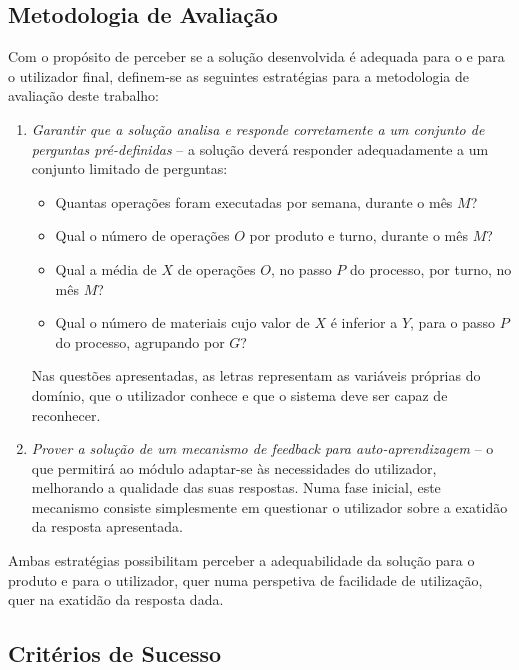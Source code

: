 \subsection{Metodologia de Avaliação}
Com o propósito de perceber se a solução desenvolvida é adequada para o {\productname} e para o utilizador final, definem-se as seguintes estratégias para a metodologia de avaliação deste trabalho:

\begin{enumerate}
\label{enum:pre1_qualitystrategies}
    \item 
    {
        \textit{Garantir que a solução analisa e responde corretamente a um conjunto de perguntas pré-definidas} -- a solução deverá responder adequadamente a um conjunto limitado de perguntas:
        \begin{itemize}
            \item 
            {
                Quantas operações foram executadas por semana, durante o mês $M$?
            }
            \item
            {
                Qual o número de operações $O$ por produto e turno, durante o mês $M$?
            }
            \item
            {
                Qual a média de $X$ de operações $O$, no passo $P$ do processo, por turno, no mês $M$? 
            }
            \item
            {
                Qual o número de materiais cujo valor de $X$ é inferior a $Y$, para o passo $P$ do processo, agrupando por $G$?
            }
        \end{itemize}
        
        Nas questões apresentadas, as letras representam as variáveis próprias do domínio, que o utilizador conhece e que o sistema deve ser capaz de reconhecer.
    }
    \item
    {
        \textit{Prover a solução de um mecanismo de feedback para auto-aprendizagem} -- o que permitirá ao módulo adaptar-se às necessidades do utilizador, melhorando a qualidade das suas respostas. Numa fase inicial, este mecanismo consiste simplesmente em questionar o utilizador sobre a exatidão da resposta apresentada.
    }
\end{enumerate}

Ambas estratégias possibilitam perceber a adequabilidade da solução para o produto e para o utilizador, quer numa perspetiva de facilidade de utilização, quer na exatidão da resposta dada.

\subsection{Critérios de Sucesso}

